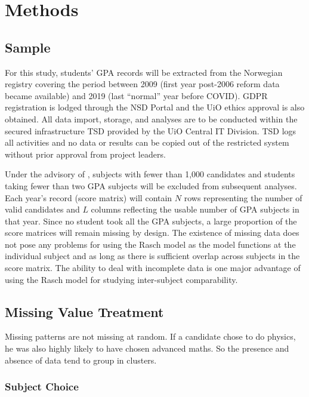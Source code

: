 \section{Methods}

\subsection{Sample}

For this study, students' GPA records will be extracted from the Norwegian registry covering the period between 2009 (first year post-2006 reform data became available) and 2019 (last ``normal'' year before COVID). GDPR registration is lodged through the NSD Portal and the UiO ethics approval is also obtained. All data import, storage, and analyses are to be conducted within the secured infrastructure TSD provided by the UiO Central IT Division. TSD logs all activities and no data or results can be copied out of the restricted system without prior approval from project leaders.

Under the advisory of \textcite{he:2018}, subjects with fewer than 1,000 candidates and students taking fewer than two GPA subjects will be excluded from subsequent analyses. Each year's record (score matrix) will contain $N$ rows representing the number of valid candidates and $L$ columns reflecting the usable number of GPA subjects in that year. Since no student took all the GPA subjects, a large proportion of the score matrices will remain missing by design. The existence of missing data does not pose any problems for using the Rasch model as the model functions at the individual subject and as long as there is sufficient overlap across subjects in the score matrix. The ability to deal with incomplete data is one major advantage of using the Rasch model for studying inter-subject comparability.

\subsection{Missing Value Treatment}

Missing patterns are not missing at random. If a candidate chose to do physics, he was also highly likely to have chosen advanced maths. So the presence and absence of data tend to group in clusters.

\subsubsection{Subject Choice}


